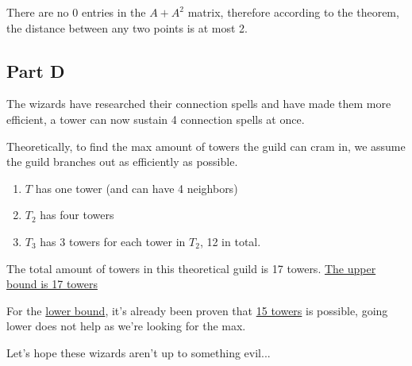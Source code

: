 \documentclass[answers]{exam}
\begin{document}
\begin{questions}
\begin{solution}
				There are no 0 entries in the $A+A^2$ matrix, therefore according to the theorem, the distance between any two points is at most 2.

				\subsection*{Part D}

				The wizards have researched their connection spells and have made them more efficient, a tower can now sustain 4 connection spells at once.

				Theoretically, to find the max amount of towers the guild can cram in, we assume the guild branches out as efficiently as possible.
				\begin{enumerate}
					\item $T$ has one tower (and can have 4 neighbors)
					\item $T_2$ has four towers
					\item $T_3$ has 3 towers for each tower in $T_2$, 12 in total.
				\end{enumerate}

				The total amount of towers in this theoretical guild is 17 towers. \underline{The upper bound is 17 towers}

				For the \underline{lower bound}, it's already been proven that \underline{15 towers} is possible, going lower does not help as we're looking for the max.

				Let's hope these wizards aren't up to something evil...
				

		\end{solution}
		
		
	\end{questions}
	
	
	
\end{document}
